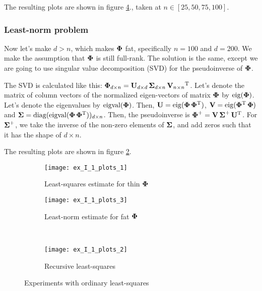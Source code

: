 The resulting plots are shown in figure \ref{fig:ex_I_1_plots_2}.,
taken at $n\in[25, 50, 75, 100]$.

\subsubsection*{Least-norm problem}

Now let's make $d>n$, which makes $\boldsymbol{\mathrm{\Phi}}$ fat, specifically $n=100$ and $d=200$.
We make the assumption that $\boldsymbol{\mathrm{\Phi}}$ is still full-rank.
The solution is the same, except we are going to use singular value decomposition (SVD)
for the pseudoinverse of $\boldsymbol{\mathrm{\Phi}}$.

The SVD is calculated like this: $\boldsymbol{\mathrm{\Phi}}_{d\times n}=\boldsymbol{\mathrm{U}}_{d\times d}\,\boldsymbol{\mathrm{\Sigma}}_{d\times n}\,\boldsymbol{\mathrm{V}}_{n\times n}\textsuperscript{T}$. Let's denote the matrix of column vectors of the normalized eigen-vectors 
of matrix $\boldsymbol{\mathrm{\Phi}}$ by $\operatorname{eig}(\boldsymbol{\mathrm{\Phi}})$. Let's denote the eigenvalues by $\operatorname{eigval}(\boldsymbol{\mathrm{\Phi}})$.
Then, $\boldsymbol{\mathrm{U}} = \operatorname{eig}(\boldsymbol{\mathrm{\Phi}}\,\boldsymbol{\mathrm{\Phi}}\textsuperscript{T})$, $\boldsymbol{\mathrm{V}} = \operatorname{eig}(\boldsymbol{\mathrm{\Phi}}\textsuperscript{T}\,\boldsymbol{\mathrm{\Phi}})$ and
$\boldsymbol{\mathrm{\Sigma}} = \operatorname{diag}(\operatorname{eigval}(\boldsymbol{\mathrm{\Phi}}\,\boldsymbol{\mathrm{\Phi}}\textsuperscript{T}))_{d\times n}$.
Then, the pseudoinverse is $\boldsymbol{\mathrm{\Phi}}^+=\boldsymbol{\mathrm{V}}\,\boldsymbol{\mathrm{\Sigma}}^+\,\boldsymbol{\mathrm{U}}\textsuperscript{T}$.
For $\boldsymbol{\mathrm{\Sigma}}^+$, we take the inverse of the non-zero elements of $\boldsymbol{\mathrm{\Sigma}}$, and add
zeros such that it has the shape of $d\times n$.

The resulting plots are shown in figure \ref{fig:ex_I_1_plots_3}.

\begin{figure}[H]
	\centering
	\begin{subfigure}[b]{.43\textwidth}
		\centering
		\texttt{[image: ex\_I\_1\_plots\_1]}
		\caption{Least-squares estimate for thin $\boldsymbol{\mathrm{\Phi}}$}
		\label{fig:ex_I_1_plots_1}
	\end{subfigure}\hfill
	\begin{subfigure}[b]{.43\textwidth}
		\centering
		\texttt{[image: ex\_I\_1\_plots\_3]}
		\caption{Least-norm estimate for fat $\boldsymbol{\mathrm{\Phi}}$}
		\label{fig:ex_I_1_plots_3}
	\end{subfigure}\\
	\begin{subfigure}[b]{.45\textwidth}
		\centering
		\vspace{6mm}
		\texttt{[image: ex\_I\_1\_plots\_2]}
		\caption{Recursive least-squares}
		\label{fig:ex_I_1_plots_2}
	\end{subfigure}
	\caption{Experiments with ordinary least-squares}
\end{figure}


